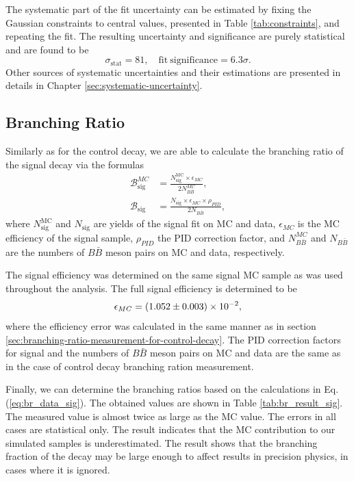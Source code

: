 The systematic part of the fit uncertainty can be estimated by fixing the Gaussian constraints to central values, presented in Table \ref{tab:constraints}, and repeating the fit. The resulting uncertainty and significance are purely statistical and are found to be
\begin{equation}
\sigma_{\mathrm{stat}} = 81,\quad\mathrm{fit~significance} = 6.3\sigma.
\end{equation}
Other sources of systematic uncertainties and their estimations are presented in details in Chapter \ref{sec:systematic-uncertainty}.

\subsection{Branching Ratio}\label{sec:branching-ratio-calculation-for-signal-decay}

Similarly as for the control decay, we are able to calculate the branching ratio of the signal decay via the formulas
\begin{align}
\mathcal{B}^{MC}_{\mathrm{sig}} &= \frac{N^{\mathrm{MC}}_\mathrm{sig} \times \epsilon_{MC}}{2N_{B\bar B}^{MC}},\\
\mathcal{B}_{\mathrm{sig}} &= \frac{N_\mathrm{sig} \times \epsilon_{MC} \times \rho_{PID}}{2N_{B\bar B}},
\label{eq:br_data_sig}
\end{align}
where $N^{\mathrm{MC}}_\mathrm{sig}$ and $N_\mathrm{sig}$ are yields of the signal fit on MC and data, $\epsilon_{MC}$ is the MC efficiency of the signal sample, $\rho_{PID}$ the PID correction factor, and $N_{B\bar B}^{MC}$ and $N_{B\bar B}$ are the numbers of $B \bar B$ meson pairs on MC and data, respectively.

The signal efficiency was determined on the same signal MC sample as was used throughout the analysis. The full signal efficiency is determined to be
\begin{equation*}
\epsilon_{MC} = (1.052 \pm 0.003)\times 10^{-2},
\end{equation*}
where the efficiency error was calculated in the same manner as in section \ref{sec:branching-ratio-measurement-for-control-decay}. The PID correction factors for signal and the numbers of $B\bar B$ meson pairs on MC and data are the same as in the case of control decay branching ration measurement.

Finally, we can determine the branching ratios based on the calculations in Eq. (\ref{eq:br_data_sig}). The obtained values are shown in Table \ref{tab:br_result_sig}. The measured value is almost twice as large as the MC value. The errors in all cases are statistical only. The result indicates that the MC contribution to our simulated samples is underestimated. The result shows that the branching fraction of the decay may be large enough to affect results in precision physics, in cases where it is ignored.

